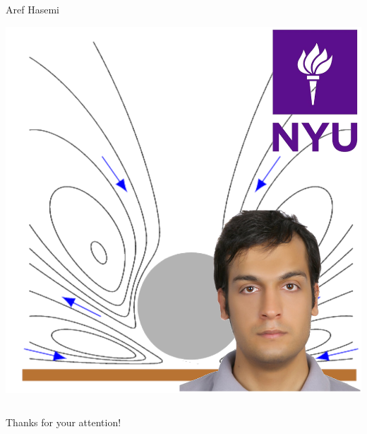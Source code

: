 \documentclass[xcolor=dvipsnames, compress]{beamer}
\begin{document}
\begin{frame}
\begin{columns}[T]
\begin{column}{0.32\linewidth}
\begin{block}{Aref Hasemi}
\begin{center}
          \includegraphics[height=0.27\paperheight]{areflink}
        \end{center}
      \end{block}
    \end{column}
  \end{columns}
\end{frame}

\begin{frame}
  \begin{center}
    \Huge Thanks for your attention!
  \end{center}
\end{frame}
\end{document}
